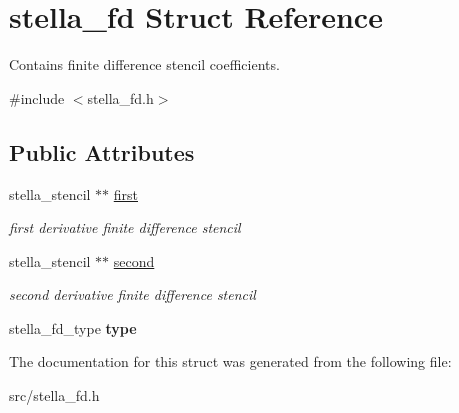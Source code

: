 \hypertarget{structstella__fd}{}\section{stella\+\_\+fd Struct Reference}
\label{structstella__fd}


Contains finite difference stencil coefficients.  




{\ttfamily \#include $<$stella\+\_\+fd.\+h$>$}

\subsection*{Public Attributes}
\begin{DoxyCompactItemize}
\item 
\mbox{\label{structstella__fd_aa59671954e61ca257a3752244deb9af7}} 
stella\+\_\+stencil $\ast$$\ast$ \mbox{\hyperlink{structstella__fd_aa59671954e61ca257a3752244deb9af7}{first}}
\begin{DoxyCompactList}\small\item\em first derivative finite difference stencil \end{DoxyCompactList}\item 
\mbox{\label{structstella__fd_a8ee0850edffa0b584f7fec78e07f905c}} 
stella\+\_\+stencil $\ast$$\ast$ \mbox{\hyperlink{structstella__fd_a8ee0850edffa0b584f7fec78e07f905c}{second}}
\begin{DoxyCompactList}\small\item\em second derivative finite difference stencil \end{DoxyCompactList}\item 
\mbox{\label{structstella__fd_aed24907996901e2ea3c6cfd10d9d6bd1}} 
stella\+\_\+fd\+\_\+type {\bfseries type}
\end{DoxyCompactItemize}


The documentation for this struct was generated from the following file\+:\begin{DoxyCompactItemize}
\item 
src/stella\+\_\+fd.\+h\end{DoxyCompactItemize}
